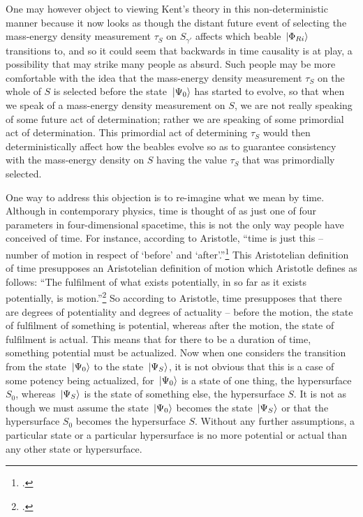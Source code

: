One may however object to viewing Kent's theory in this non-deterministic manner because it now looks as though the distant future event of selecting the mass-energy density measurement $\tau_S$  on $S_{\gamma'}$ affects which beable $\ket*{\Phi_{Ri}}$ transitions to, and so it could seem that backwards in time causality is at play, a possibility that may strike many people as absurd. Such people may be more comfortable with the idea that the mass-energy density measurement $\tau_S$ on the whole of $S$ is selected before the state $\ket*{\Psi_0}$ has started to evolve, so that when we speak of a mass-energy density measurement on $S$, we are not really speaking of some future act of determination; rather we are speaking of some primordial act of determination. This primordial act of determining $\tau_S$ would then deterministically affect how the beables evolve so as to guarantee consistency with the mass-energy density on $S$ having the value $\tau_S$ that was primordially selected.

One way to address this objection is to re-imagine what we mean by time. Although in contemporary physics, time is thought of as just one of four parameters in four-dimensional spacetime, this is not the only way people have conceived of time. For instance, according to Aristotle, ``time is just this -- number of motion in respect of `before' and `after'.''\footnote{\cite[ Book IV. Chapter 11 (219b 1-5)]{AristotlePhysics}.} This Aristotelian definition of time presupposes an Aristotelian definition of motion which Aristotle defines as follows: ``The fulfilment of what exists potentially, in so far as it exists potentially, is motion.''\footnote{\cite[ Book III. Chapter 1 (201a10)]{AristotlePhysics}.} So according to Aristotle, time presupposes that there are degrees of potentiality and degrees of actuality -- before the motion, the state of fulfilment of something is potential, whereas after the motion, the state of fulfilment is actual. This means that for there to be a duration of time, something potential must be actualized. Now when one considers the transition from the state $\ket*{\Psi_0}$ to the state  $\ket*{\Psi_S}$, it is not obvious that this is a case of some potency being actualized, for $\ket*{\Psi_0}$ is a state of one thing, the hypersurface $S_0$,  whereas $\ket*{\Psi_S}$ is the state of something else, the hypersurface $S$. It is not as though we must assume the state $\ket*{\Psi_0}$ becomes the state $\ket*{\Psi_S}$ or that the hypersurface $S_0$ becomes the hypersurface $S$. Without any further assumptions, a particular state or a particular hypersurface is no more potential or actual than any other state or hypersurface. 

